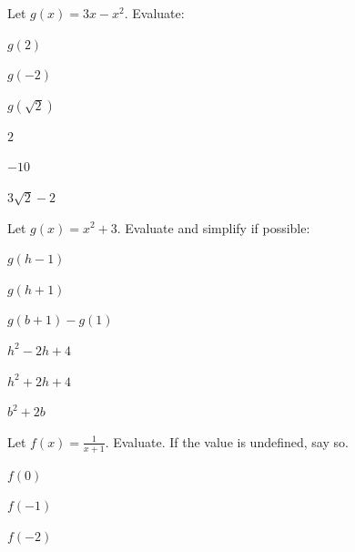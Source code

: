 \begin{exercise}
Let $g(x)=3x-x^2$. Evaluate: 


\begin{parts}
\item $g(2)$
\item $g(-2)$
\item $g(\sqrt{2})$
\end{parts}
\end{exercise}




\begin{solution}

\begin{parts}
\item $2$ 
\item $-10$
\item $3\sqrt{2}-2$
\end{parts}
\end{solution}







\begin{exercise}
Let $g(x)=x^2+3$. Evaluate and simplify if possible: 


\begin{parts}
\item $g(h-1)$
\item $g(h+1)$
\item $g(b+1)-g(1)$
\end{parts}
\end{exercise}


\begin{solution}

\begin{parts}
\item $h^2-2h+4$ 
\item $h^2+2h+4$
\item $b^2+2b$
\end{parts}
\end{solution}








\begin{exercise}
Let $\displaystyle f(x)=\frac{1}{x+1}$. Evaluate. If the value is undefined, say so. 


\begin{parts}
\item $f(0)$
\item $f(-1)$
\item $f(-2)$
\end{parts}
\end{exercise}


